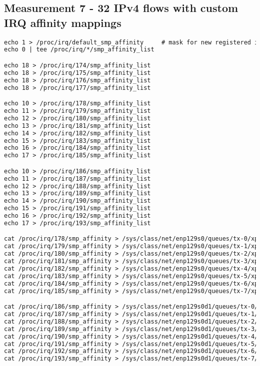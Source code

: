 
\subsection{Measurement 7 - 32 IPv4 flows with custom IRQ affinity mappings}

\begin{lstlisting}[language=TeX]
echo 1 > /proc/irq/default_smp_affinity     # mask for new registered irqs
echo 0 | tee /proc/irq/*/smp_affinity_list

echo 18 > /proc/irq/174/smp_affinity_list 
echo 18 > /proc/irq/175/smp_affinity_list 
echo 18 > /proc/irq/176/smp_affinity_list 
echo 18 > /proc/irq/177/smp_affinity_list 

echo 10 > /proc/irq/178/smp_affinity_list 
echo 11 > /proc/irq/179/smp_affinity_list 
echo 12 > /proc/irq/180/smp_affinity_list 
echo 13 > /proc/irq/181/smp_affinity_list 
echo 14 > /proc/irq/182/smp_affinity_list 
echo 15 > /proc/irq/183/smp_affinity_list 
echo 16 > /proc/irq/184/smp_affinity_list 
echo 17 > /proc/irq/185/smp_affinity_list

echo 10 > /proc/irq/186/smp_affinity_list
echo 11 > /proc/irq/187/smp_affinity_list 
echo 12 > /proc/irq/188/smp_affinity_list 
echo 13 > /proc/irq/189/smp_affinity_list 
echo 14 > /proc/irq/190/smp_affinity_list 
echo 15 > /proc/irq/191/smp_affinity_list 
echo 16 > /proc/irq/192/smp_affinity_list 
echo 17 > /proc/irq/193/smp_affinity_list

cat /proc/irq/178/smp_affinity > /sys/class/net/enp129s0/queues/tx-0/xps_cpus
cat /proc/irq/179/smp_affinity > /sys/class/net/enp129s0/queues/tx-1/xps_cpus
cat /proc/irq/180/smp_affinity > /sys/class/net/enp129s0/queues/tx-2/xps_cpus
cat /proc/irq/181/smp_affinity > /sys/class/net/enp129s0/queues/tx-3/xps_cpus
cat /proc/irq/182/smp_affinity > /sys/class/net/enp129s0/queues/tx-4/xps_cpus
cat /proc/irq/183/smp_affinity > /sys/class/net/enp129s0/queues/tx-5/xps_cpus
cat /proc/irq/184/smp_affinity > /sys/class/net/enp129s0/queues/tx-6/xps_cpus
cat /proc/irq/185/smp_affinity > /sys/class/net/enp129s0/queues/tx-7/xps_cpus

cat /proc/irq/186/smp_affinity > /sys/class/net/enp129s0d1/queues/tx-0/xps_cpus
cat /proc/irq/187/smp_affinity > /sys/class/net/enp129s0d1/queues/tx-1/xps_cpus
cat /proc/irq/188/smp_affinity > /sys/class/net/enp129s0d1/queues/tx-2/xps_cpus
cat /proc/irq/189/smp_affinity > /sys/class/net/enp129s0d1/queues/tx-3/xps_cpus
cat /proc/irq/190/smp_affinity > /sys/class/net/enp129s0d1/queues/tx-4/xps_cpus
cat /proc/irq/191/smp_affinity > /sys/class/net/enp129s0d1/queues/tx-5/xps_cpus
cat /proc/irq/192/smp_affinity > /sys/class/net/enp129s0d1/queues/tx-6/xps_cpus
cat /proc/irq/193/smp_affinity > /sys/class/net/enp129s0d1/queues/tx-7/xps_cpus
\end{lstlisting}

